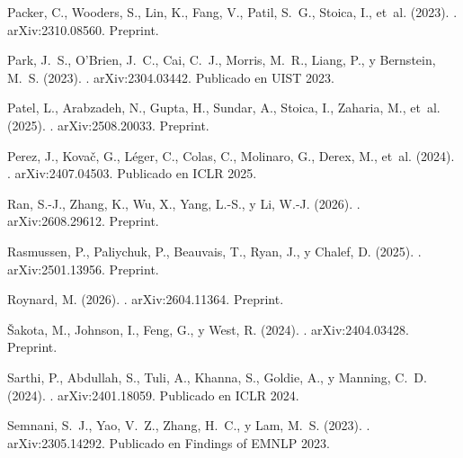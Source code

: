 \documentclass[11pt,letterpaper]{article}
\begin{document}
\begin{thebibliography}{}
Packer, C., Wooders, S., Lin, K., Fang, V., Patil, S.~G., Stoica, I., et~al.
  (2023).
.
\newblock arXiv:2310.08560. Preprint.

Park, J.~S., O'Brien, J.~C., Cai, C.~J., Morris, M.~R., Liang, P., y Bernstein,
  M.~S. (2023).
.
\newblock arXiv:2304.03442. Publicado en UIST 2023.

Patel, L., Arabzadeh, N., Gupta, H., Sundar, A., Stoica, I., Zaharia, M.,
  et~al. (2025).
.
\newblock arXiv:2508.20033. Preprint.

Perez, J., Kovač, G., Léger, C., Colas, C., Molinaro, G., Derex, M., et~al.
  (2024).
.
\newblock arXiv:2407.04503. Publicado en ICLR 2025.

Ran, S.-J., Zhang, K., Wu, X., Yang, L.-S., y Li, W.-J. (2026).
.
\newblock arXiv:2608.29612. Preprint.

Rasmussen, P., Paliychuk, P., Beauvais, T., Ryan, J., y Chalef, D. (2025).
.
\newblock arXiv:2501.13956. Preprint.

Roynard, M. (2026).
.
\newblock arXiv:2604.11364. Preprint.

Šakota, M., Johnson, I., Feng, G., y West, R. (2024).
.
\newblock arXiv:2404.03428. Preprint.

Sarthi, P., Abdullah, S., Tuli, A., Khanna, S., Goldie, A., y Manning, C.~D.
  (2024).
.
\newblock arXiv:2401.18059. Publicado en ICLR 2024.

Semnani, S.~J., Yao, V.~Z., Zhang, H.~C., y Lam, M.~S. (2023).
.
\newblock arXiv:2305.14292. Publicado en Findings of EMNLP 2023.


\end{thebibliography}
\end{document}
